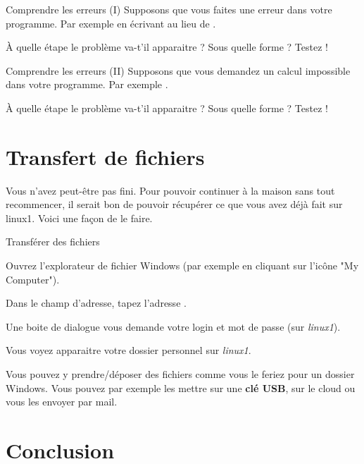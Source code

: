 \documentclass[a4paper,11pt]{style-esi/td}
\begin{document}
	\begin{Exercice}{Comprendre les erreurs (I)}
		Supposons que vous faites une erreur dans votre programme.
		Par exemple en écrivant  
		au lieu de .

		À quelle étape le problème va-t'il apparaitre ?
		Sous quelle forme ? Testez !
	\end{Exercice}

	\begin{Exercice}{Comprendre les erreurs (II)}
		Supposons que vous demandez un calcul impossible dans votre programme.
		Par exemple .

		À quelle étape le problème va-t'il apparaitre ?
		Sous quelle forme ? Testez !
	\end{Exercice}

\section{Transfert de fichiers}  

	Vous n'avez peut-être pas fini. Pour pouvoir continuer à la maison sans tout recommencer, 
    il serait bon de pouvoir récupérer ce que vous avez déjà fait sur linux1.
	Voici une façon de le faire.			
				
	\begin{Tutoriel}{Transférer des fichiers}
	\begin{steps}		
		\item 
			Ouvrez l'explorateur de fichier Windows (par exemple en cliquant sur l'icône "My Computer").
		\item 
			Dans le champ d'adresse, tapez l'adresse .
		\item 
			Une boite de dialogue vous demande votre login et mot de passe (sur \textit{linux1}).
		\item 
			Vous voyez apparaitre votre dossier personnel sur \textit{linux1}. 
		\item 
			Vous pouvez y prendre/déposer des fichiers comme vous le feriez pour un dossier Windows. 
			Vous pouvez par exemple les mettre sur une \textbf{clé USB},
			sur le cloud ou vous les envoyer par mail.
	\end{steps}
	\end{Tutoriel}			

\section{Conclusion}
\end{document}
